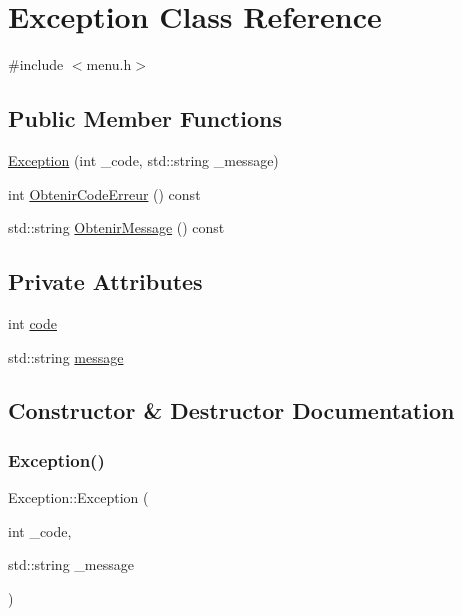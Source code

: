 \hypertarget{class_exception}{}\section{Exception Class Reference}
\label{class_exception}


{\ttfamily \#include $<$menu.\+h$>$}

\subsection*{Public Member Functions}
\begin{DoxyCompactItemize}
\item 
\hyperlink{class_exception_a283c77c5196279d4190cff644722babd}{Exception} (int \+\_\+code, std\+::string \+\_\+message)
\item 
int \hyperlink{class_exception_a5959862a5c9a2c2a0ef9f51cd1e91c36}{Obtenir\+Code\+Erreur} () const
\item 
std\+::string \hyperlink{class_exception_a75a61c52bbe35fe208ddb9eb4a15a151}{Obtenir\+Message} () const
\end{DoxyCompactItemize}
\subsection*{Private Attributes}
\begin{DoxyCompactItemize}
\item 
int \hyperlink{class_exception_a9a71c9fe2c765fc8dd0f7e97a20b636b}{code}
\item 
std\+::string \hyperlink{class_exception_a80bf622a8fc3c48fa6ab1a3fc024ff91}{message}
\end{DoxyCompactItemize}


\subsection{Constructor \& Destructor Documentation}
\mbox{\label{class_exception_a283c77c5196279d4190cff644722babd}} 
\subsubsection{\texorpdfstring{Exception()}{Exception()}}
{\footnotesize\ttfamily Exception\+::\+Exception (\begin{DoxyParamCaption}\item[{int}]{\+\_\+code,  }\item[{std\+::string}]{\+\_\+message }\end{DoxyParamCaption})}



